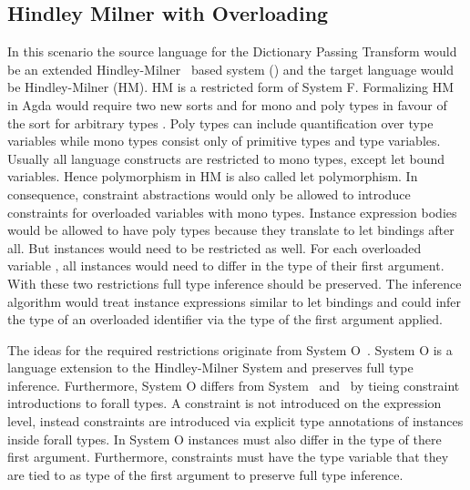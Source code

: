 \subsection{Hindley Milner with Overloading}
In this scenario the source language for the Dictionary Passing Transform would be an extended Hindley-Milner~\cite{hm} based system (\HMo) and the target language would be Hindley-Milner (HM). 
HM is a restricted form of System F. Formalizing HM in Agda would require two new sorts  and  for mono and poly types in favour of the sort for arbitrary types . Poly types can include quantification over type variables while mono types consist only of primitive types and type variables. 
Usually all language constructs are restricted to mono types, except let bound variables. 
Hence polymorphism in HM is also called let polymorphism.  
In consequence, constraint abstractions would only be allowed to introduce constraints for overloaded variables with mono types. 
Instance expression bodies would be allowed to have poly types because they translate to let bindings after all.
But instances would need to be restricted as well. For each overloaded variable , all instances would need to differ in the type of their first argument.
With these two restrictions full type inference should be preserved. The inference algorithm would treat instance expressions similar to let bindings and could infer the type of an overloaded identifier via the type of the first argument applied.

\noindent The ideas for the required restrictions originate from System O~\cite{syso}. System O is a language extension to the Hindley-Milner System and preserves full type inference. Furthermore, System O differs from System \Fo\ and \HMo\ by tieing constraint introductions to forall types. 
A constraint is not introduced on the expression level, instead constraints are introduced via explicit type annotations of instances inside forall types. 
In System O instances must also differ in the type of there first argument. 
Furthermore, constraints must have the type variable that they are tied to as type of the first argument to preserve full type inference.


